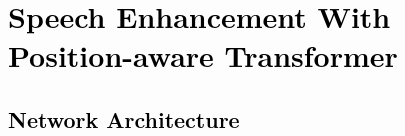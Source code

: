 \documentclass[journal]{IEEEtran}
\begin{document}




\section{\textcolor{black}{Speech Enhancement With Position-aware Transformer}}
\label{sec:5}

\subsection{\textcolor{black}{Network Architecture}}\label{sec4.1}

\end{document}
